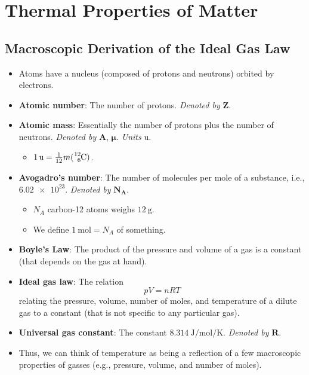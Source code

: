 \documentclass[../notes.tex]{subfiles}
\begin{document}
\chapter{Thermal Properties of Matter}
\section{Macroscopic Derivation of the Ideal Gas Law}
\begin{itemize}
    \item {}Atoms have a nucleus (composed of protons and neutrons) orbited by electrons.
    \item \textbf{Atomic number}: The number of protons. \emph{Denoted by} $\bm{Z}$.
    \item \textbf{Atomic mass}: Essentially the number of protons plus the number of neutrons. \emph{Denoted by} $\bm{A}$, $\bm{\mu}$. \emph{Units} $\si{\atomicmassunit}$.
    \begin{itemize}
        \item $\SI{1}{\atomicmassunit}=\frac{1}{12}m(\ce{{}^{12}_6C})$.
    \end{itemize}
    \item \textbf{Avogadro's number}: The number of molecules per mole of a substance, i.e., $\num{6.02e23}$. \emph{Denoted by} $\bm{N_A}$.
    \begin{itemize}
        \item $N_A$ carbon-12 atoms weighs $\SI{12}{\gram}$.
        \item We define $\SI{1}{\mole}=N_A$ of something.
    \end{itemize}
    \item \textbf{Boyle's Law}: The product of the pressure and volume of a gas is a constant (that depends on the gas at hand).
    \item \textbf{Ideal gas law}: The relation
    \begin{equation*}
        pV = nRT
    \end{equation*}
    relating the pressure, volume, number of moles, and temperature of a dilute gas to a constant (that is not specific to any particular gas).
    \item \textbf{Universal gas constant}: The constant $\SI[per-mode=fraction]{8.314}{\joule\per\mole\per\kelvin}$. \emph{Denoted by} $\bm{R}$.
    \item Thus, we can think of temperature as being a reflection of a few macroscopic properties of gasses (e.g., pressure, volume, and number of moles).
\end{itemize}
\end{document}
